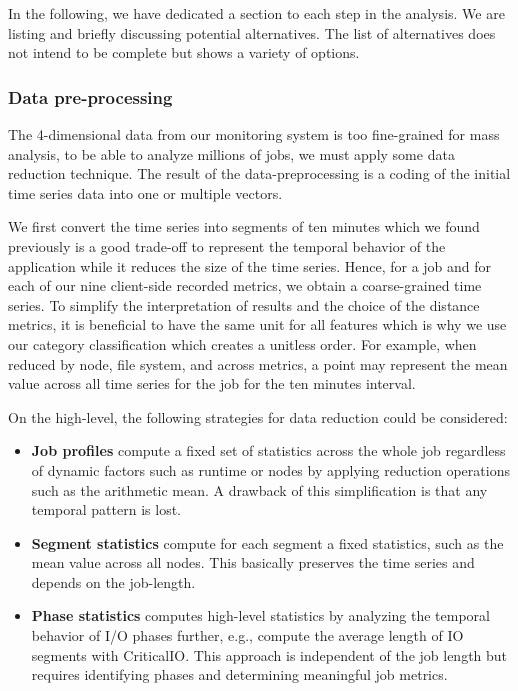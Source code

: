 \documentclass{jhps}
\begin{document}
In the following, we have dedicated a section to each step in the analysis.
We are listing and briefly discussing potential alternatives.
The list of alternatives does not intend to be complete but shows a variety of options.

\subsubsection{Data pre-processing}
The 4-dimensional data from our monitoring system is too fine-grained for mass analysis,
to be able to analyze millions of jobs, we must apply some data reduction technique.
The result of the data-preprocessing is a coding of the initial time series data into one or multiple vectors.

We first convert the time series into segments of ten minutes which we found previously is a good trade-off to represent the temporal behavior of the application while it reduces the size of the time series.
Hence, for a job and for each of our nine client-side recorded metrics, we obtain a coarse-grained time series.
To simplify the interpretation of results and the choice of the distance metrics, it is beneficial to have the same unit for all features which is why we use our category classification which creates a unitless order.
For example, when reduced by node, file system, and across metrics, a point may represent the mean value across all time series for the job for the ten minutes interval.

On the high-level, the following strategies for data reduction could be considered:
\begin{itemize}
	\item \textbf{Job profiles} compute a fixed set of statistics across the whole job regardless of dynamic factors such as runtime or nodes by applying reduction operations such as the arithmetic mean.
		A drawback of this simplification is that any temporal pattern is lost.
	\item \textbf{Segment statistics} compute for each segment a fixed statistics, such as the mean value across all nodes.
		This basically preserves the time series and depends on the job-length.
	\item \textbf{Phase statistics} computes high-level statistics by analyzing the temporal behavior of I/O phases further, e.g., compute the average length of IO segments with CriticalIO.
		This approach is independent of the job length but requires identifying phases and determining meaningful job metrics.
\end{itemize}
\end{document}
